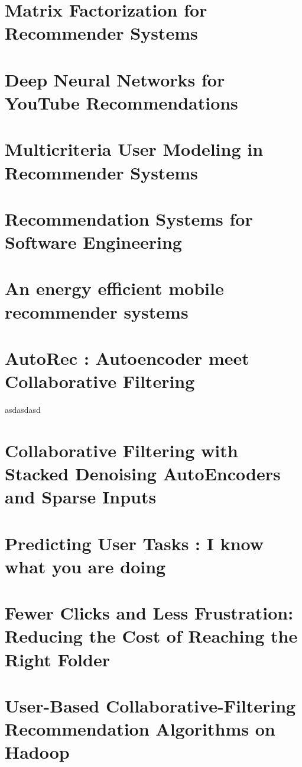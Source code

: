\documentclass[oneside]{book}
\begin{document}
\section{Matrix Factorization for Recommender Systems}

\section{Deep Neural Networks for YouTube Recommendations}

\section{Multicriteria User Modeling in Recommender Systems}

\section{Recommendation Systems for Software Engineering}

\section{An energy efficient mobile recommender systems}

\section{AutoRec : Autoencoder meet Collaborative Filtering}
asdasdasd
\section{Collaborative Filtering with Stacked Denoising AutoEncoders and Sparse Inputs}

\section{Predicting User Tasks : I know what you are doing}

\section{Fewer Clicks and Less Frustration: Reducing the Cost of Reaching the Right Folder }

\section{User-Based Collaborative-Filtering Recommendation Algorithms on Hadoop}
\end{document}
